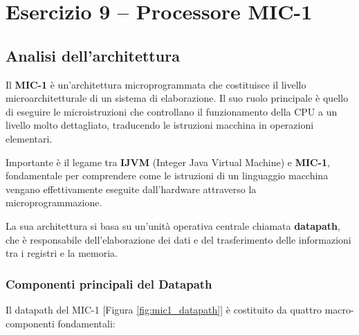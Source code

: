 \section{Esercizio 9 -- Processore MIC-1}
\subsection{Analisi dell'architettura}
Il \textbf{MIC-1} è un'architettura microprogrammata che costituisce il livello microarchitetturale di un sistema di elaborazione. Il suo ruolo principale è quello di eseguire le microistruzioni che controllano il funzionamento della CPU a un livello molto dettagliato, traducendo le istruzioni macchina in operazioni elementari.

Importante è il legame tra \textbf{IJVM} (Integer Java Virtual Machine) e \textbf{MIC-1}, fondamentale per comprendere come le istruzioni di un linguaggio macchina vengano effettivamente eseguite dall'hardware attraverso la microprogrammazione.

La sua architettura si basa su un'unità operativa centrale chiamata \textbf{datapath}, che è responsabile dell'elaborazione dei dati e del trasferimento delle informazioni tra i registri e la memoria.

\subsubsection*{Componenti principali del Datapath}

Il datapath del MIC-1 [Figura \ref{fig:mic1_datapath}] è costituito da quattro macro-componenti fondamentali:

